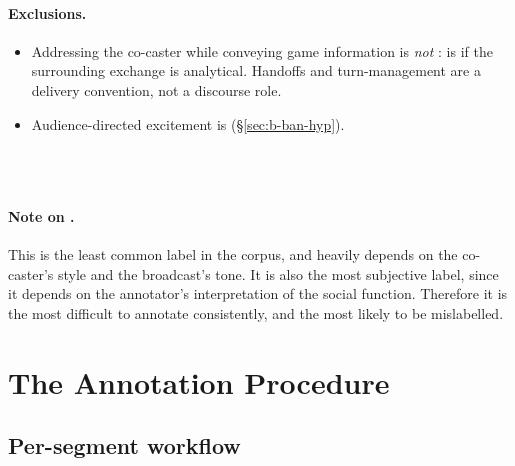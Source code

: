 \paragraph{Exclusions.}
\begin{itemize}
  \item Addressing the co-caster while conveying game information is \emph{not} \BAN{}:  is \SA{} if the surrounding exchange is analytical. Handoffs and turn-management are a delivery convention, not a discourse role.
  \item Audience-directed excitement is \HYP{} (\S\ref{sec:b-ban-hyp}).
\end{itemize}

\begin{agexample}
\\[2pt]
\\[2pt]
\end{agexample}

\paragraph{Note on \cBAN{}.} This is the least common label in the corpus, and heavily depends on the co-caster's style and the broadcast's tone. It is also the most subjective label, since it depends on the annotator's interpretation of the social function. Therefore it is the most difficult to annotate consistently, and the most likely to be mislabelled.

\section{The Annotation Procedure}
\label{sec:procedure}

\subsection{Per-segment workflow}

